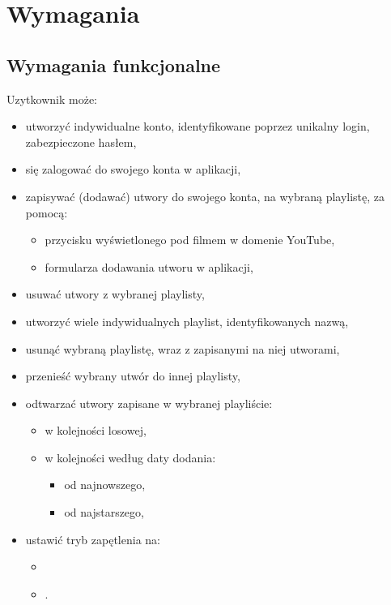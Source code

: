 \section{Wymagania}
\subsection{Wymagania funkcjonalne}
Uzytkownik może:
\renewcommand\labelitemii{$\bullet$}
\renewcommand\labelitemiii{$\bullet$}
\begin{itemize}
    \item utworzyć indywidualne konto, identyfikowane poprzez unikalny login, zabezpieczone hasłem,
    \item się zalogować do swojego konta w aplikacji,
    \item zapisywać (dodawać) utwory do swojego konta, na wybraną playlistę, za pomocą:
          \begin{itemize}
              \item przycisku wyświetlonego pod filmem w domenie YouTube,
              \item formularza dodawania utworu w aplikacji,
          \end{itemize}
    \item usuwać utwory z wybranej playlisty,
    \item utworzyć wiele indywidualnych playlist, identyfikowanych nazwą,
    \item usunąć wybraną playlistę, wraz z zapisanymi na niej utworami,
    \item przenieść wybrany utwór do innej playlisty,
    \item odtwarzać utwory zapisane w wybranej playliście:
          \begin{itemize}
              \item w kolejności losowej,
              \item w kolejności według daty dodania:
                    \begin{itemize}
                        \item od najnowszego,
                        \item od najstarszego,
                    \end{itemize}
          \end{itemize}
    \item ustawić tryb zapętlenia na:
          \begin{itemize}
              \item {}
              \item {}.
          \end{itemize}
\end{itemize}

